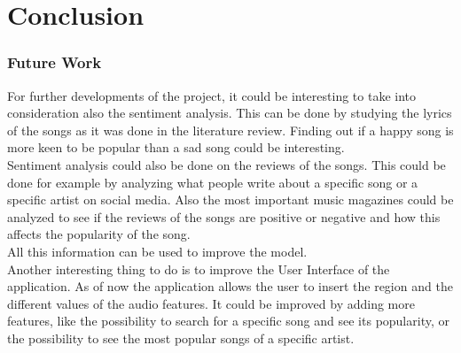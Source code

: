 \chapter{Conclusion}

\subsection{Future Work}
For further developments of the project, it could be interesting to take into consideration also the sentiment analysis.
This can be done by studying the lyrics of the songs as it was done in the literature review. 
Finding out if a happy song is more keen to be popular than a sad song could be interesting.\\
Sentiment analysis could also be done on the reviews of the songs.
This could be done for example by analyzing what people write about a specific song or a specific artist on social media. Also the most important music magazines could be analyzed to see if the reviews of the songs are positive or negative and how this affects the popularity of the song.\\
All this information can be used to improve the model.\\
Another interesting thing to do is to improve the User Interface of the application. As of now the application allows the user to insert the region and the different values of the audio features. It could be improved by adding more features, like the possibility to search for a specific song and see its popularity, or the possibility to see the most popular songs of a specific artist.\\




